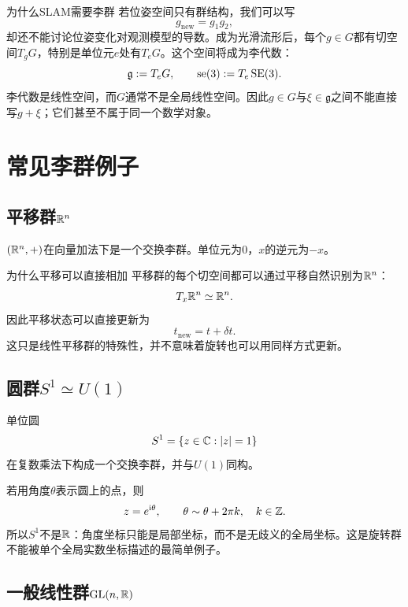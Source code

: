 \begin{lieexample}{为什么SLAM需要李群}
若位姿空间只有群结构，我们可以写
\[
    g_{\mathrm{new}}=g_1g_2,
\]
却还不能讨论位姿变化对观测模型的导数。成为光滑流形后，每个$g\in G$都有切空间$T_gG$，特别是单位元$e$处有$T_eG$。这个空间将成为李代数：
\[
    \mathfrak g:=T_eG,
    \qquad
    \operatorname{se}(3):=T_e\operatorname{SE}(3).
\]
李代数是线性空间，而$G$通常不是全局线性空间。因此$g\in G$与$\xi\in\mathfrak g$之间不能直接写$g+\xi$；它们甚至不属于同一个数学对象。
\end{lieexample}


\section{常见李群例子}

\subsection{平移群$\mathbb{R}^n$}

\begin{definition}[平移李群]
$(\mathbb{R}^n,+)$在向量加法下是一个交换李群。单位元为$0$，$x$的逆元为$-x$。
\end{definition}

\begin{lieexample}{为什么平移可以直接相加}
平移群的每个切空间都可以通过平移自然识别为$\mathbb{R}^n$：
\[
    T_x\mathbb{R}^n\simeq\mathbb{R}^n.
\]
因此平移状态可以直接更新为
\[
    t_{\mathrm{new}}=t+\delta t.
\]
这只是线性平移群的特殊性，并不意味着旋转也可以用同样方式更新。
\end{lieexample}

\subsection{圆群$S^1\simeq U(1)$}

\begin{definition}[圆群]
单位圆
\[
    S^1=\{z\in\mathbb{C}:|z|=1\}
\]
在复数乘法下构成一个交换李群，并与$U(1)$同构。
\end{definition}

若用角度$\theta$表示圆上的点，则
\[
    z=e^{\mathrm i\theta},
    \qquad
    \theta\sim\theta+2\pi k,\quad k\in\mathbb{Z}.
\]
所以$S^1$不是$\mathbb{R}$：角度坐标只能是局部坐标，而不是无歧义的全局坐标。这是旋转群不能被单个全局实数坐标描述的最简单例子。

\subsection{一般线性群$\mathrm{GL}(n,\mathbb{R})$}

